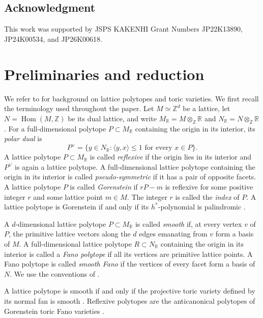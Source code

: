 \documentclass[10pt,a4paper]{amsart}
\theoremstyle{definition}
\newcommand{\ZZ}{\mathbb Z}
\newcommand{\RR}{\mathbb R}
\begin{document}
\subsection*{Acknowledgment}
This work was supported by JSPS KAKENHI Grant Numbers
JP22K13890, JP24K00534, and JP26K00618.


\section{Preliminaries and reduction}\label{sec:closure}

We refer to \cite{CoxLittleSchenck} for background on lattice polytopes
and toric varieties.  We first recall the terminology used throughout
the paper. Let $M\simeq
\ZZ^d$ be a lattice, let $N=\operatorname{Hom}(M,\ZZ)$ be its dual lattice,
and write $M_{\RR}=M\otimes_{\ZZ}\RR$ and $N_{\RR}=N\otimes_{\ZZ}\RR$.
For a full-dimensional polytope $P\subset M_{\RR}$ containing the origin in
its interior, its \emph{polar dual} is
\[
P^\vee
=
\{y\in N_{\RR}:\langle y,x\rangle\le1\text{ for every }x\in P\}.
\]
A lattice polytope $P\subset M_{\RR}$ is called \emph{reflexive} if the
origin lies in its interior and $P^\vee$ is again a lattice polytope.
A full-dimensional lattice polytope containing the origin in its
interior is called \emph{pseudo-symmetric} if it has a pair of
opposite facets.
A lattice polytope $P$ is called \emph{Gorenstein} if $rP-m$ is reflexive
for some positive integer $r$ and some lattice point $m\in M$.
The integer $r$ is called the \emph{index} of $P$.
A lattice polytope is Gorenstein if and only if its $h^*$-polynomial is
palindromic \cite{HibiDual,FerroniHigashitani}.

A $d$-dimensional lattice polytope $P\subset M_{\RR}$ is called
\emph{smooth} if, at every vertex $v$ of $P$, the primitive lattice vectors
along the $d$ edges emanating from $v$ form a basis of $M$.  A
full-dimensional lattice polytope $R\subset N_{\RR}$ containing the origin
in its interior is called a \emph{Fano polytope} if all its vertices are
primitive lattice points.  A Fano polytope is called \emph{smooth Fano} if
the vertices of every facet form a basis of $N$. 
We use the conventions of
\cite{Ewald,EwaldBook,HaaseThesis}.

A lattice polytope is smooth if and only if the projective toric
variety defined by its normal fan is smooth
\cite[Theorem~2.4.3]{CoxLittleSchenck}.
Reflexive polytopes are the anticanonical polytopes of Gorenstein
toric Fano varieties
\cite[Theorem~8.3.4]{CoxLittleSchenck}.
\end{document}

